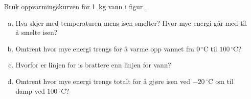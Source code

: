 %
Bruk oppvarmingskurven for \SI{1}{\kilo\gram} vann i figur~.
\begin{enumerate}[a)]
    \item Hva skjer med temperaturen mens isen smelter? Hvor mye energi går med til å smelte isen?
    \item Omtrent hvor mye energi trengs for å varme opp vannet fra $0\,^\circ$C til $100\,^\circ$C?
    \item Hvorfor er linjen for is brattere enn linjen for vann?
    \item Omtrent hvor mye energi trengs totalt for å gjøre isen ved $-20\,^\circ$C om til damp ved $100\,^\circ$C?
\end{enumerate}
%
